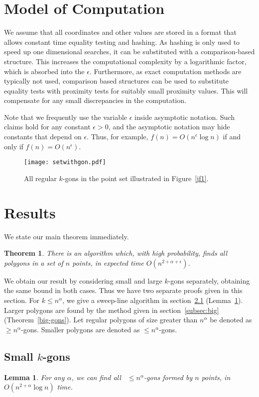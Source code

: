 \documentclass{article}
\newtheorem{theorem}{Theorem}
\newtheorem{lemma}{Lemma}
\begin{document}
\section{Model of Computation}
\label{model}
We assume that all coordinates and other values are stored in a format
that allows constant time equality testing and hashing. As hashing is
only used to speed up one dimensional searches, it can be substituted
with a comparison-based structure. This increases the computational complexity by a 
logarithmic factor, which
is absorbed into the $\epsilon$. Furthermore, as exact computation
methods are typically not used, comparison based structures can be
used to substitute equality tests with proximity tests for
suitably small proximity values.  This will compensate for any small discrepancies in
the computation.

Note that we frequently use the variable $\epsilon$ inside asymptotic notation. Such claims hold for any constant $\epsilon >0$, and the asymptotic notation may hide constants that depend on $\epsilon$. Thus, for example, $f(n)=O(n^\epsilon \log n)$ if and only if $f(n)= O(n^\epsilon)$.


\begin{figure}[t!]
\center\texttt{[image: setwithgon.pdf]}
\caption{All regular $k$-gons in the point set illustrated
in Figure~\ref{jf1}.}
\label{jf2}
\end{figure}


\section{Results}
We state our main theorem immediately.
\begin{theorem}
There is an algorithm which, with high probability, finds all  polygons in a set of $n$ points,
in expected time $O(n^{2{+}\alpha+\epsilon})$.
\end{theorem}
We obtain our result by considering small and large $k$-gons separately, obtaining the same bound in both cases.   Thus we have two separate proofs given in this section.
For $k\leq n^\alpha$, we give a sweep-line algorithm in section~\ref{subsec:small} (Lemma~\ref{l1}).
Larger polygons are found by the method given in section~\ref{subsec:big} (Theorem~\ref{big-gons}).
Let regular polygons of size greater than $n^\alpha$ be denoted as ${\geq}n^\alpha$-gons.
Smaller polygons are denoted as  ${\leq}n^\alpha$-gons.

\subsection{Small $k$-gons}
\label{subsec:small}
\begin{lemma}
\label{l1}
For any $\alpha$, we can 
find all ~${\leq} n^{\alpha}$-gons formed by $n$ points, in $O(n^{2{+}\alpha}\log n)$ time. 
\end{lemma}
\end{document}
